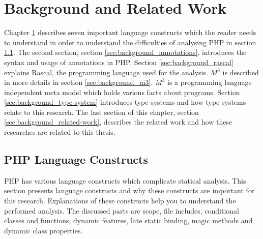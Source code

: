 \documentclass[../main.tex]{subfiles}
\begin{document}
    \chapter{Background and Related Work}\label{ch:background}
    Chapter \ref{ch:background} describes seven important language constructs which the reader needs to understand in order to understand the difficulties of analysing PHP in section \ref{sec:background_language-constructs}.
    The second section, section \ref{sec:background_annotations}, introduces the syntax and usage of annotations in PHP.
    Section \ref{sec:background_rascal} explains \Gls{Rascal}, the programming language used for the analysis.
    $M^3$ is described in more details in section \ref{sec:background_m3}.
    $M^3$ is a programming language independent meta model which holds various facts about programs. 
    Section \ref{sec:background_type-system} introduces type systems and how type systems relate to this research.
    The last section of this chapter, section \ref{sec:background_related-work}, describes the related work and how these researches are related to this thesis.

    \section{PHP Language Constructs}\label{sec:background_language-constructs}
    PHP has various language constructs which complicate statical analysis. 
    This section presents language constructs and why these constructs are important for this research.
    Explanations of these constructs help you to understand the performed analysis.
    The discussed parts are scope, file includes, conditional classes and functions, dynamic features, late static binding, magic methods and dynamic class properties.
    
\end{document}
